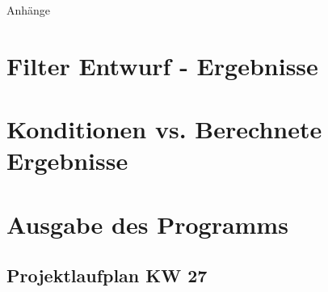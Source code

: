 %
%
%
\begin{appendix}

\newpage

\begin{center}
	\huge{Anhänge}
\end{center}

\normalsize

\section{Filter Entwurf - Ergebnisse}
\label{FirFilterResult}

\newpage
\section{Konditionen vs. Berechnete Ergebnisse}
\label{cond_vs_results}


\newpage
\section{Ausgabe des Programms}
\label{output_program}



\newpage
\begin{landscape}
	\section{Projektlaufplan KW 27}
	\label{sec:projectplan}
	\scalebox{.75}{
		
		}
\end{landscape}


\end{appendix}
